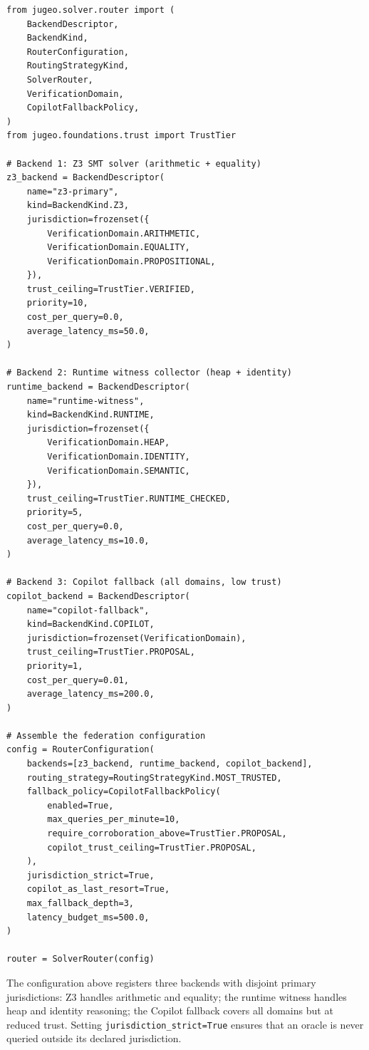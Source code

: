 \documentclass[11pt]{article}
\begin{document}
\begin{lstlisting}[style=jugeo-python, caption={%
  Configuring a three-backend oracle federation
  (using \texttt{src/jugeo/solver/router.py}).}]
from jugeo.solver.router import (
    BackendDescriptor,
    BackendKind,
    RouterConfiguration,
    RoutingStrategyKind,
    SolverRouter,
    VerificationDomain,
    CopilotFallbackPolicy,
)
from jugeo.foundations.trust import TrustTier

# Backend 1: Z3 SMT solver (arithmetic + equality)
z3_backend = BackendDescriptor(
    name="z3-primary",
    kind=BackendKind.Z3,
    jurisdiction=frozenset({
        VerificationDomain.ARITHMETIC,
        VerificationDomain.EQUALITY,
        VerificationDomain.PROPOSITIONAL,
    }),
    trust_ceiling=TrustTier.VERIFIED,
    priority=10,
    cost_per_query=0.0,
    average_latency_ms=50.0,
)

# Backend 2: Runtime witness collector (heap + identity)
runtime_backend = BackendDescriptor(
    name="runtime-witness",
    kind=BackendKind.RUNTIME,
    jurisdiction=frozenset({
        VerificationDomain.HEAP,
        VerificationDomain.IDENTITY,
        VerificationDomain.SEMANTIC,
    }),
    trust_ceiling=TrustTier.RUNTIME_CHECKED,
    priority=5,
    cost_per_query=0.0,
    average_latency_ms=10.0,
)

# Backend 3: Copilot fallback (all domains, low trust)
copilot_backend = BackendDescriptor(
    name="copilot-fallback",
    kind=BackendKind.COPILOT,
    jurisdiction=frozenset(VerificationDomain),
    trust_ceiling=TrustTier.PROPOSAL,
    priority=1,
    cost_per_query=0.01,
    average_latency_ms=200.0,
)

# Assemble the federation configuration
config = RouterConfiguration(
    backends=[z3_backend, runtime_backend, copilot_backend],
    routing_strategy=RoutingStrategyKind.MOST_TRUSTED,
    fallback_policy=CopilotFallbackPolicy(
        enabled=True,
        max_queries_per_minute=10,
        require_corroboration_above=TrustTier.PROPOSAL,
        copilot_trust_ceiling=TrustTier.PROPOSAL,
    ),
    jurisdiction_strict=True,
    copilot_as_last_resort=True,
    max_fallback_depth=3,
    latency_budget_ms=500.0,
)

router = SolverRouter(config)
\end{lstlisting}

The configuration above registers three backends with disjoint primary
jurisdictions: Z3 handles arithmetic and equality; the runtime witness
handles heap and identity reasoning; the Copilot fallback covers all
domains but at reduced trust.  Setting \texttt{jurisdiction\_strict=True}
ensures that an oracle is never queried outside its declared jurisdiction.
\end{document}
